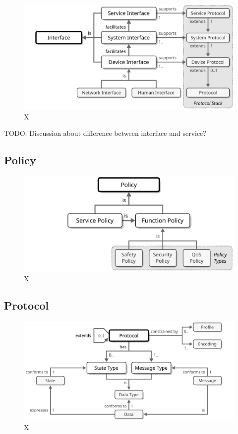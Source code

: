 \begin{figure}[ht!]
  \centering
  \includegraphics{figures/interface}
  \caption{
    X
  }
  \label{fig:interface}
\end{figure}

TODO: Discussion about difference between interface and service?

\subsection{Policy}
\label{sec:reference-model:policy}

\begin{figure}[ht!]
  \centering
  \includegraphics{figures/policy}
  \caption{
    X
  }
  \label{fig:policy}
\end{figure}

\subsection{Protocol}
\label{sec:reference-model:protocol}

\begin{figure}[ht!]
  \centering
  \includegraphics{figures/protocol}
  \caption{
    X
  }
  \label{fig:protocol}
\end{figure}


